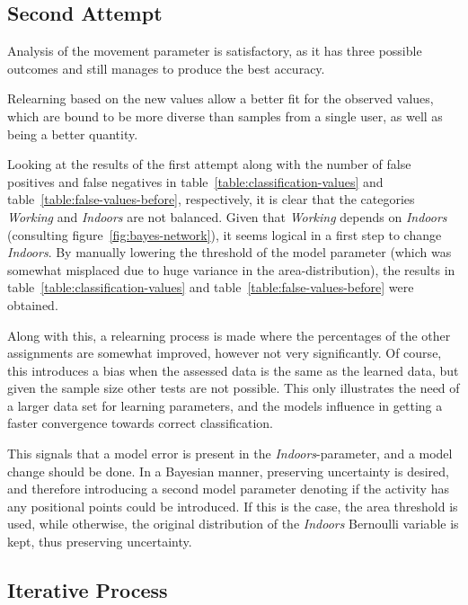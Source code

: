 \subsection{Second Attempt}

Analysis of the movement parameter is satisfactory, as it has three
possible outcomes and still manages to produce the best accuracy.

Relearning based on the new values allow a better fit for the observed
values, which are bound to be more diverse than samples from a single
user, as well as being a better quantity.

Looking at the results of the first attempt along with the number of
false positives and false negatives in table~\ref{table:classification-values} 
and table~\ref{table:false-values-before}, respectively, it is clear
that the categories \emph{Working} and \emph{Indoors} are not balanced.
Given that \emph{Working} depends on \emph{Indoors} (consulting 
figure~\ref{fig:bayes-network}), it seems logical in a first step to 
change \emph{Indoors}. By manually lowering the threshold of the 
model parameter (which was somewhat misplaced due to huge variance 
in the area-distribution), the results in table~\ref{table:classification-values} 
and table~\ref{table:false-values-before} were obtained.

Along with this, a relearning process is made where the percentages of 
the other assignments are somewhat improved, however not very 
significantly. Of course, this introduces a bias when the assessed data
is the same as the learned data, but given the sample size other tests
are not possible. This only illustrates the need of a larger data set 
for learning parameters, and the models influence in getting a faster
convergence towards correct classification.

This signals that a model error is present in the \emph{Indoors}-parameter,
and a model change should be done. In a Bayesian manner, preserving 
uncertainty is desired, and therefore introducing a second model
parameter denoting if the activity has any positional points could be
introduced. If this is the case, the area threshold is used, while 
otherwise, the original distribution of the \emph{Indoors} Bernoulli
variable is kept, thus preserving uncertainty.

\subsection{Iterative Process}

